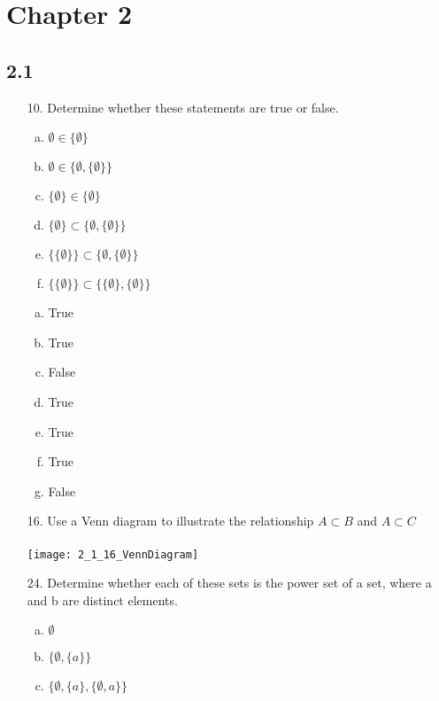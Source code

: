 \section{Chapter 2}
\subsection{2.1}
\begin{itemize}
   \item[10.] Determine whether these statements are true or false.
         \begin{enumerate}[a.]
            \item $\emptyset \in \{\emptyset\} $
            \item $\emptyset \in \{\emptyset, \{\emptyset \}\}$
            \item $\{\emptyset\} \in \{\emptyset \}$
            \item $\{\emptyset\} \subset \{\emptyset, \{\emptyset\}\}$
            \item $\{\{\emptyset\}\} \subset \{\emptyset, \{\emptyset\}\}$
            \item $\{\{\emptyset\}\} \subset \{\{\emptyset\}, \{\emptyset\}\}$
         \end{enumerate}
         \answer
         \begin{enumerate}[a.]
            \item True
            \item True
            \item False
            \item True
            \item True
            \item True
            \item False
         \end{enumerate}
   \item[16.] Use a Venn diagram to illustrate the relationship $A \subset B$ and $A \subset C$\\
         \answer \\
         \texttt{[image: 2\_1\_16\_VennDiagram]}
   \item[24.] Determine whether each of these sets is the power set of a set, where a and b are distinct elements.
         \begin{enumerate}[a.]
            \item $\emptyset$
            \item $\{\emptyset, \{a\}\}$
            \item $\{\emptyset, \{a\}, \{\emptyset, a\}\}$

\end{enumerate}
\end{itemize}
